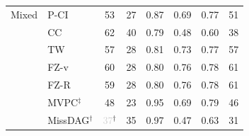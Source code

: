 \begin{tabular}{llcccccc}
    \midrule
    Mixed     & P-CI               & 53 & 27 & 0.87 & 0.69 & 0.77 & 51 \\
              & CC                 & 62 & 40 & 0.79 & 0.48 & 0.60 & 38 \\
              & TW                 & 57 & 28 & 0.81 & 0.73 & 0.77 & 57 \\
              & FZ-v               & 60 & 28 & 0.80 & 0.76 & 0.78 & 61 \\
              & FZ-R               & 59 & 28 & 0.80 & 0.76 & 0.78 & 61 \\
              & MVPC$^\ddagger$    & 48 & 23 & 0.95 & 0.69 & 0.79 & 46 \\
              & MissDAG$^\dagger$  & \textcolor{lightgray}{37}$^\dagger$ & 35 & 0.97 & 0.47 & 0.63 & 31 \\
    \bottomrule
\end{tabular}
